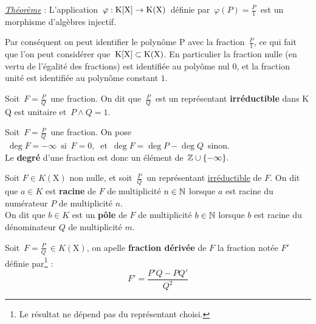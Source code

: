 \vspace*{1.3cm}

\noindent\underline{\emph{Théorème}} : L'application \(\,\varphi : \text{K}[\text{X}] \to\text{K}(\text{X})\,\) définie par \(\,\displaystyle \varphi(P)=\frac{P}{1}\,\) est un morphisme d'algèbres injectif.\vspace{0.1cm}\\
\begin{small}Par conséquent on peut identifier le polynôme P avec la fraction $\,\frac{P}{1}$, ce qui fait que l'on peut considérer que \(\,\text{K}[\text{X}]\subset \text{K}(\text{X})\). En particulier la fraction nulle (en vertu de l'égalité des fractions) est identifiée au polyôme nul $0$, et la fraction unité est identifiée au polynôme constant $1$.\end{small}

\vspace{1.6cm}

Soit \(\,\displaystyle F=\frac{P}{Q}\,\) une fraction. On dit que \(\,\displaystyle\frac{P}{Q}\,\) est un représentant \textbf{irréductible} dans K \ssi Q est unitaire et \( \,P\wedge Q=1\).  

\vspace{1.2cm}

Soit \(\,\displaystyle F=\frac{P}{Q}\,\) une fraction. On pose \(\;\deg F=-\infty \, \text{ si } \,F=0,\ \text{ et }\, \deg F= \deg P-\deg Q\,\) sinon.\vspace{0.1cm}\\
Le \textbf{degré} d'une fraction est donc un élément de \(\,\mathbb{Z}\cup \{-\infty\}.\)

\vspace{1.1cm}

Soit \(F\in K(\text{X})\) non nulle, et soit \(\,\displaystyle\frac{P}{Q}\,\) un représentant \underline{irréductible} de $F$. On dit que \(a\in K\) est \textbf{racine} de $F$ de multiplicité $n\in \mathbb{N}$\expo{*} lorsque $a$ est racine du numérateur $P$ de multiplicité $n$.\vspace{0.2cm}\\
On dit que $b\in K$ est un \textbf{pôle} de $F$ de multiplicité $b\in\mathbb{N}$\expo{*} lorsque $b$ est racine du dénominateur $Q$ de multiplicité $m$.

\vspace{1.3cm}

Soit \(\,\displaystyle F=\frac{P}{Q}\,\in K(\text{X})\), on apelle \textbf{fraction dérivée} de $F$ la fraction notée $F'$ définie par\footnote{Le résultat ne dépend pas du représentant choisi.} : \vspace{-0.2cm}
\[F'=\frac{P'Q-PQ'}{Q^2}\]

